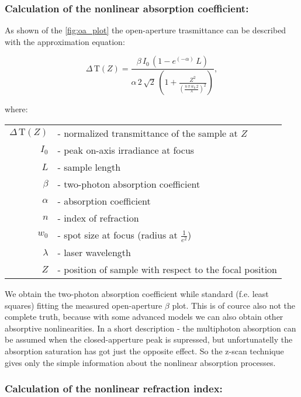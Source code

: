 \documentclass[12pt,twoside,a4paper]{article}
\numberwithin{equation}{subsection}
\numberwithin{figure}{subsection}
\begin{document}
\subsubsection*{Calculation of the nonlinear absorption coefficient:}

As shown of the \ref{fig:oa_plot} the open-aperture trasmittance can be described with the approximation equation:

\begin{equation}
  \Delta \,\mathrm{T}(Z)=\frac {\beta \,{I_{0}}\,(1 - e^{( - \alpha )}\,L)}{\alpha \,2\,\sqrt{2}\, \left(  \! 1 + \frac
  {Z^{2}}{(\frac {n\,\pi \,{w_{0}}\,2}{\lambda })^{2}} \!  \right) },
\end{equation}
 
where: 

\begin{tabular}{ r l }
   $\Delta \,\mathrm{T}(Z)$ & - normalized transmittance of the sample at $Z$ \\
   ${I_{0}}$ & - peak on-axis irradiance at focus \\
   $L$ & - sample length \\
   $\beta $ & - two-photon absorption coefficient \\
   $\alpha $ & - absorption coefficient \\
   $n$ & - index of refraction \\
   ${w_{0}}$ & - spot size at focus (radius at $\frac {1}{e^{2}}$) \\
   $\lambda $ & - laser wavelength \\
   $Z$ & - position of sample with respect to the focal position \\
\end{tabular}

We obtain the two-photon absorption coefficient while standard (f.e. least squares) fitting the measured open-aperture $\beta $ 
plot. This is of cource also not the complete truth, because with some advanced models we can also obtain other absorptive
nonlinearities. In a short description - the multiphoton absorption can be assumed when the closed-apperture peak is supressed, but
unfortunatelly the absorption saturation has got just the opposite effect. So the z-scan technique gives only the simple
information about the nonlinear absorption processes.

\subsubsection*{Calculation of the nonlinear refraction index:}
\end{document}
